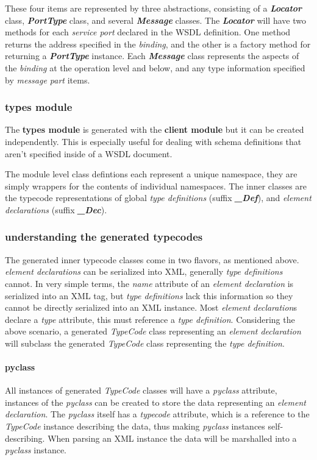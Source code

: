 These four items are represented by three abstractions, consisting of a
{\it \bfseries Locator} class, {\it \bfseries PortType} class, and several 
{\it \bfseries Message} classes. The {\it \bfseries Locator} will have two methods for each {\it service port} declared in
the WSDL definition.  One method returns the address specified in the {\it binding}, and the other is a factory method for returning a {\it \bfseries PortType}
instance.  Each {\it \bfseries Message} class represents the aspects of the {\it binding}
at the operation level and below, and any type information specified by {\it message part} items.

\subsubsection{types module}
The {\bfseries types module} is generated with the {\bfseries client module} but
it can be created independently.  This is especially useful for dealing with
schema definitions that aren't specified inside of a WSDL document.  

The module level class defintions each represent a unique namespace, they are
simply wrappers for the contents of individual namespaces.  The inner classes
are the typecode representations of global {\it type definitions} (suffix {\it \bfseries _Def}), 
and {\it element declarations} (suffix {\it \bfseries _Dec}).

\subsubsection{understanding the generated typecodes}
The generated inner typecode classes come in two flavors, as mentioned above. 
{\it element declarations} can be serialized into XML, generally {\it type
definitions} cannot. In very simple terms, the {\it name} attribute of an {\it element declaration} is serialized into an XML tag, but {\it type
definitions} lack this information so they cannot be directly serialized into an
XML instance.  Most {\it element declaration}s declare a {\it type} attribute,
this must reference a {\it type definition}.  Considering the above scenario, a
generated {\it TypeCode} class representing an {\it element declaration} will
subclass the generated {\it TypeCode} class representing the {\it type 
definition}.

\paragraph{pyclass}
All instances of generated {\it TypeCode} classes will have a {\it pyclass}
attribute, instances of the {\it pyclass} can be created to store the data
representing an {\it element declaration}.  The {\it pyclass} itself has a {\it
typecode} attribute, which is a reference to the {\it
TypeCode} instance describing the data, thus making {\it pyclass} instances 
self-describing. 
When parsing an XML instance the data will be marshalled into a {\it pyclass}
instance.

